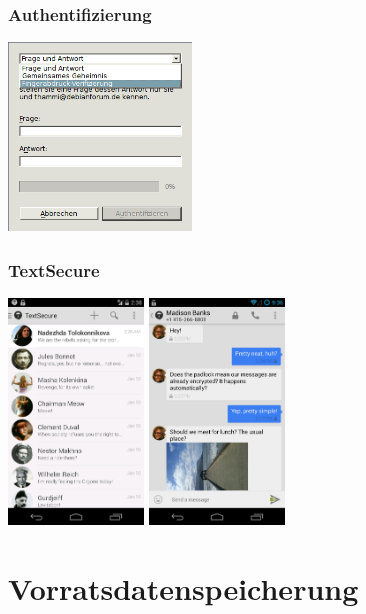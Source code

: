 \documentclass[12pt]{beamer}
\begin{document}
\begin{frame}
  \frametitle{Authentifizierung}
    \begin{center}
      \includegraphics[height=5cm]{img/auth.png}
    \end{center}
\end{frame}

\begin{frame}
  \frametitle{TextSecure}
    \begin{center}
      \includegraphics[height=6cm]{img/textsecure1.png}
      \hspace{0.5cm}
      \includegraphics[height=6cm]{img/textsecure2.png}
    \end{center}
\end{frame}

\section{Vorratsdatenspeicherung}
\end{document}
